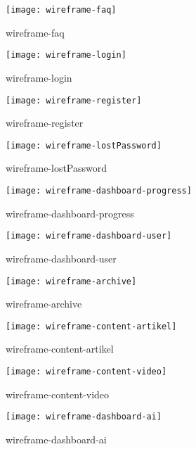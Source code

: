 \documentclass[]{report}
\begin{document}
\begin{figure}
	\centering
	\texttt{[image: wireframe-faq]}
	\caption{wireframe-faq}
	\label{fig:wireframe-faq}
\end{figure}

\begin{figure}
	\centering
	\texttt{[image: wireframe-login]}
	\caption{wireframe-login}
	\label{fig:wireframe-login}
\end{figure}


\begin{figure}
	\centering
	\texttt{[image: wireframe-register]}
	\caption{wireframe-register}
	\label{fig:wireframe-register}
\end{figure}

\begin{figure}
	\centering
	\texttt{[image: wireframe-lostPassword]}
	\caption{wireframe-lostPassword}
	\label{fig:wireframe-lostPassword}
\end{figure}


\begin{figure}
	\centering
	\texttt{[image: wireframe-dashboard-progress]}
	\caption{wireframe-dashboard-progress}
	\label{fig:wireframe-dashboard-progress}
\end{figure}

\begin{figure}
	\centering
	\texttt{[image: wireframe-dashboard-user]}
	\caption{wireframe-dashboard-user}
	\label{fig:wireframe-dashboard-user}
\end{figure}

\begin{figure}
	\centering
	\texttt{[image: wireframe-archive]}
	\caption{wireframe-archive}
	\label{fig:wireframe-archive}
\end{figure}

\begin{figure}
	\centering
	\texttt{[image: wireframe-content-artikel]}
	\caption{wireframe-content-artikel}
	\label{fig:wireframe-content-artikel}
\end{figure}

\begin{figure}
	\centering
	\texttt{[image: wireframe-content-video]}
	\caption{wireframe-content-video}
	\label{fig:wireframe-content-video}
\end{figure}

\begin{figure}
	\centering
	\texttt{[image: wireframe-dashboard-ai]}
	\caption{wireframe-dashboard-ai}
	\label{fig:wireframe-dashboard-ai}
\end{figure}
\end{document}

